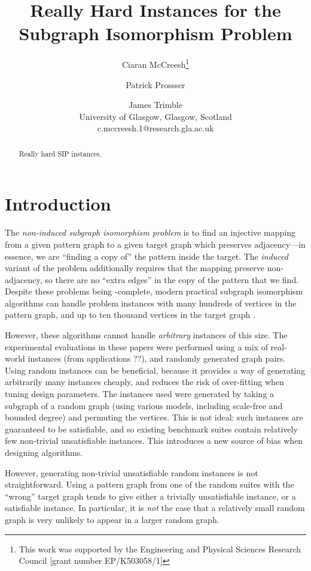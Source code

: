 \documentclass[letterpaper]{article}
\title{Really Hard Instances for the Subgraph Isomorphism Problem}
\author{Ciaran McCreesh\thanks{This work was supported by the Engineering and Physical Sciences
    Research Council [grant number EP/K503058/1]} \and Patrick Prossser \and James Trimble \\
University of Glasgow, Glasgow, Scotland \\
c.mccreesh.1@research.gla.ac.uk}
\begin{document}
\maketitle

\begin{abstract}
    Really hard SIP instances.
\end{abstract}

\section{Introduction}

The \emph{non-induced subgraph isomorphism problem} is to find an injective mapping from a given
pattern graph to a given target graph which preserves adjacency---in essence, we are ``finding a
copy of'' the pattern inside the target. The \emph{induced} variant of the problem additionally
requires that the mapping preserve non-adjacency, so there are no ``extra edges'' in the copy of the
pattern that we find. Despite these problems being \NP-complete, modern practical subgraph
isomorphism algorithms can handle problem instances with many hundreds of vertices in the pattern
graph, and up to ten thousand vertices in the target graph
\cite{Cordella:2004,Solnon:2010,Audemard:2014,McCreesh:2015}.

However, these algorithms cannot handle \emph{arbitrary} instances of this size. The experimental
evaluations in these papers were performed using a mix of real-world instances (from applications
??), and randomly generated graph pairs. Using random instances can be beneficial, because it
provides a way of generating arbitrarily many instances cheaply, and reduces the risk of
over-fitting when tuning design parameters. The instances used were generated by taking a subgraph
of a random graph (using various models, including scale-free and bounded degree) and permuting the
vertices.  This is not ideal: such instances are guaranteed to be satisfiable, and so existing
benchmark suites contain relatively few non-trivial unsatisfiable instances. This introduces a new
source of bias when designing algorithms.

However, generating non-trivial unsatisfiable random instances is not straightforward. Using a
pattern graph from one of the random suites with the ``wrong'' target graph tends to give either a
trivially unsatisfiable instance, or a satisfiable instance. In particular, it is \emph{not} the
case that a relatively small random graph is very unlikely to appear in a larger random graph.
\end{document}
